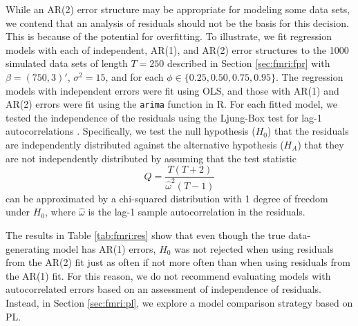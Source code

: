 While an AR(2) error structure may be appropriate for modeling some data sets, we contend that an analysis of residuals should not be the basis for this decision. This is because of the potential for overfitting. To illustrate, we fit regression models with each of independent, AR(1), and AR(2) error structures to the 1000 simulated data sets of length $T = 250$ described in Section \ref{sec:fmri:fpr} with $\beta = (750,3)'$, $\sigma^2 = 15$, and for each $\phi \in \{0.25,0.50,0.75,0.95\}$. The regression models with independent errors were fit using OLS, and those with AR(1) and AR(2) errors were fit using the {\tt arima} function in R. For each fitted model, we tested the independence of the residuals using the Ljung-Box test for lag-1 autocorrelations \citep{box:test:1978}. Specifically, we test the null hypothesis ($H_0$) that the residuals are independently distributed against the alternative hypothesis ($H_A$) that they are not independently distributed by assuming that the test statistic
\begin{equation}
Q = \frac{T(T+2)}{\hat{\omega}^2(T-1)} \label{eqn:box}
\end{equation}
can be approximated by a chi-squared distribution with 1 degree of freedom under $H_0$, where $\hat{\omega}$ is the lag-1 sample autocorrelation in the residuals.

The results in Table \ref{tab:fmri:res} show that even though the true data-generating model has AR(1) errors, $H_0$ was not rejected when using residuals from the AR(2) fit just as often if not more often than when using residuals from the AR(1) fit. For this reason, we do not recommend evaluating models with autocorrelated errors based on an assessment of independence of residuals. Instead, in Section \ref{sec:fmri:pl}, we explore a model comparison strategy based on PL.

